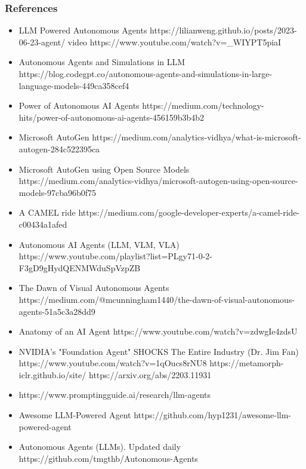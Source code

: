\begin{frame}[fragile]\frametitle{References}
\begin{itemize}
\item LLM Powered Autonomous Agents https://lilianweng.github.io/posts/2023-06-23-agent/ video https://www.youtube.com/watch?v=\_WIYPT5piaI
\item Autonomous Agents and Simulations in LLM https://blog.codegpt.co/autonomous-agents-and-simulations-in-large-language-models-449ca358cef4
\item Power of Autonomous AI Agents https://medium.com/technology-hits/power-of-autonomous-ai-agents-456159b3b4b2
\item Microsoft AutoGen https://medium.com/analytics-vidhya/what-is-microsoft-autogen-284c522395ca
\item Microsoft AutoGen using Open Source Models https://medium.com/analytics-vidhya/microsoft-autogen-using-open-source-models-97cba96b0f75
\item A CAMEL ride https://medium.com/google-developer-experts/a-camel-ride-c00434a1afed
\item Autonomous AI Agents (LLM, VLM, VLA) https://www.youtube.com/playlist?list=PLgy71-0-2-F3gD9gHydQENMWduSpVzpZB
\item The Dawn of Visual Autonomous Agents https://medium.com/@mcunningham1440/the-dawn-of-visual-autonomous-agents-51a5c3a28dd9
\item Anatomy of an AI Agent https://www.youtube.com/watch?v=zdwgIe4zdsU
\item NVIDIA's "Foundation Agent" SHOCKS The Entire Industry (Dr. Jim Fan) https://www.youtube.com/watch?v=1qOucs8rNU8 https://metamorph-iclr.github.io/site/ https://arxiv.org/abs/2203.11931
\item https://www.promptingguide.ai/research/llm-agents
\item Awesome LLM-Powered Agent https://github.com/hyp1231/awesome-llm-powered-agent
\item Autonomous Agents (LLMs). Updated daily https://github.com/tmgthb/Autonomous-Agents
\end{itemize}
\end{frame}
